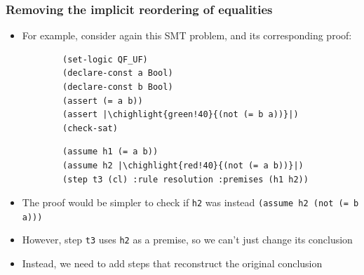 \documentclass[usepdftitle=false,aspectratio=169]{beamer}
\newcommand\vitem{\vfill\item}
\newcommand\chighlight[2]{\setlength{\fboxsep}{0pt}\colorbox{#1}{#2\strut}}
\begin{document}
\begin{frame}[fragile]
  \frametitle{Removing the implicit reordering of equalities}
  \begin{itemize}
    \item For example, consider again this SMT problem, and its corresponding
    proof:
    \begin{minipage}[t]{0.35 \textwidth}
      \begin{verbatim}
        (set-logic QF_UF)
        (declare-const a Bool)
        (declare-const b Bool)
        (assert (= a b))
        (assert |\chighlight{green!40}{(not (= b a))}|)
        (check-sat)
      \end{verbatim}
    \end{minipage}
    \hfill
    \begin{minipage}[t]{0.6 \textwidth}
      \begin{verbatim}
        (assume h1 (= a b))
        (assume h2 |\chighlight{red!40}{(not (= a b))}|)
        (step t3 (cl) :rule resolution :premises (h1 h2))
      \end{verbatim}
    \end{minipage}
    \vitem The proof would be simpler to check if \texttt{h2} was instead
    \texttt{(assume h2 (not (= b a)))}
    \vitem However, step \texttt{t3} uses \texttt{h2} as a premise, so we can't
    just change its conclusion
    \pause
    \vitem Instead, we need to add steps that reconstruct the original
    conclusion
  \end{itemize}
\end{frame}
\end{document}
